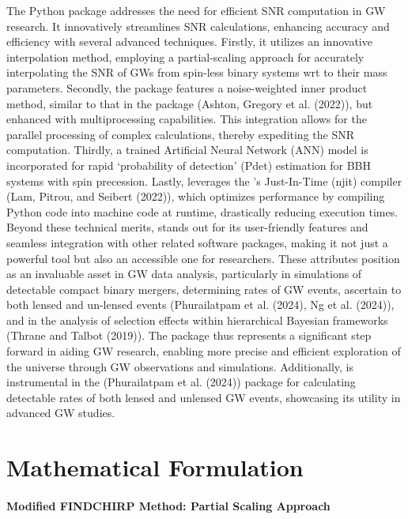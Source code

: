 \documentclass[10pt,a4paper,onecolumn]{article}
\let\textttOrig=\texttt
\def\texttt#1{\expandafter\textttOrig{\seqsplit{#1}}}
\let\oldparagraph\paragraph
\renewcommand{\paragraph}[1]{\oldparagraph{#1}\mbox{}}
\begin{document}
The \emph{\texttt{gwsnr}} Python package addresses the need for
efficient SNR computation in GW research. It innovatively streamlines
SNR calculations, enhancing accuracy and efficiency with several
advanced techniques. Firstly, it utilizes an innovative interpolation
method, employing a partial-scaling approach for accurately
interpolating the SNR of GWs from spin-less binary systems wrt to their
mass parameters. Secondly, the package features a noise-weighted inner
product method, similar to that in the \emph{\texttt{bilby}} package
(Ashton, Gregory et al. (2022)), but enhanced with multiprocessing
capabilities. This integration allows for the parallel processing of
complex calculations, thereby expediting the SNR computation. Thirdly, a
trained Artificial Neural Network (ANN) model is incorporated for rapid
`probability of detection' (Pdet) estimation for BBH systems with spin
precession. Lastly, \emph{\texttt{gwsnr}} leverages the
\emph{\texttt{numba}}'s Just-In-Time (njit) compiler (Lam, Pitrou, and
Seibert (2022)), which optimizes performance by compiling Python code
into machine code at runtime, drastically reducing execution times.
Beyond these technical merits, \emph{\texttt{gwsnr}} stands out for its
user-friendly features and seamless integration with other related
software packages, making it not just a powerful tool but also an
accessible one for researchers. These attributes position
\emph{\texttt{gwsnr}} as an invaluable asset in GW data analysis,
particularly in simulations of detectable compact binary mergers,
determining rates of GW events, ascertain to both lensed and un-lensed
events (Phurailatpam et al. (2024), Ng et al. (2024)), and in the
analysis of selection effects within hierarchical Bayesian frameworks
(Thrane and Talbot (2019)). The package thus represents a significant
step forward in aiding GW research, enabling more precise and efficient
exploration of the universe through GW observations and simulations.
Additionally, \emph{\texttt{gwsnr}} is instrumental in the
\emph{\texttt{ler}} (Phurailatpam et al. (2024)) package for calculating
detectable rates of both lensed and unlensed GW events, showcasing its
utility in advanced GW studies.

\section{Mathematical Formulation}\label{mathematical-formulation}

\paragraph{Modified FINDCHIRP Method: Partial Scaling
Approach}\label{modified-findchirp-method-partial-scaling-approach}
\end{document}
